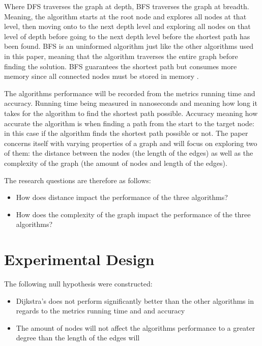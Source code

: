 \documentclass{csfourzero}
\begin{document}
Where DFS traverses the graph at depth, BFS traverses the graph at breadth. Meaning, the algorithm starts at the root node and explores all nodes at that level, then moving onto to the next depth level and exploring all nodes on that level of depth before going to the next depth level before the shortest path has been found. BFS is an uninformed algorithm just like the other algorithms used in this paper, meaning that the algorithm traverses the entire graph before finding the solution. 
BFS guarantees the shortest path but consumes more memory since all connected nodes must be stored in memory \cite{ashish2021path}. 

The algorithms performance will be recorded from the metrics running time and accuracy. Running time being measured in nanoseconds and meaning how long it takes for the algorithm to find the shortest path possible. Accuracy meaning how accurate the algorithm is when finding a path from the start to the target node: in this case if the algorithm finds the shortest path possible or not. The paper concerns itself with varying properties of a graph and will focus on exploring two of them: the distance between the nodes (the length of the edges) as well as the complexity of the graph (the amount of nodes and length of the edges). 

\vspace{0.25cm} 
The research questions are therefore as follows: 
\begin{itemize}
    \item How does distance impact the performance of the three algorithms?
    \item How does the complexity of the graph impact the performance of the three algorithms?
\end{itemize}

\vspace{0.5cm} 

\section{Experimental Design}
\label{sec:exp}
The following null hypothesis were constructed:
\begin{itemize}
    \item Dijkstra's does not perform significantly better than the other algorithms in regards to the metrics running time and and accuracy
    \item The amount of nodes will not affect the algorithms performance to a greater degree than the length of the edges will  
\end{itemize}
\end{document}
